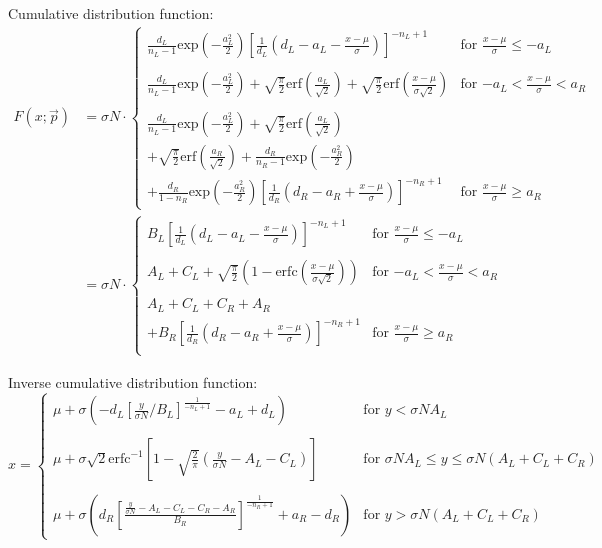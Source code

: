 Cumulative distribution function:
\begin{align}
F(x;\vec{p}) &= \sigma N \cdot \begin{cases}
\frac{d_{L}}{n_{L}-1}\text{exp}\left(-\frac{a_{L}^2}{2}\right) \left[\frac{1}{d_{L}}\left(d_{L}-a_{L}-\frac{x-\mu}{\sigma}\right)\right]^{-n_{L}+1} & \text{for $\frac{x-\mu}{\sigma} \leq -a_{L}$} \\
\\
\frac{d_{L}}{n_{L}-1}\text{exp}\left(-\frac{a_{L}^2}{2}\right) + \sqrt{\frac{\pi}{2}}\text{erf}\left(\frac{a_{L}}{\sqrt{2}}\right) + \sqrt{\frac{\pi}{2}}\text{erf}\left(\frac{x-\mu}{\sigma \sqrt{2}}\right) & \text{for $-a_{L} < \frac{x-\mu}{\sigma} < a_{R}$} \\
\\
\frac{d_{L}}{n_{L}-1}\text{exp}\left(-\frac{a_{L}^2}{2}\right) + \sqrt{\frac{\pi}{2}}\text{erf}\left(\frac{a_{L}}{\sqrt{2}}\right)\\
 + \sqrt{\frac{\pi}{2}}\text{erf}\left(\frac{a_{R}}{\sqrt{2}}\right) + \frac{d_{R}}{n_{R}-1}\text{exp}\left(-\frac{a_{R}^2}{2}\right) \\
 + \frac{d_{R}}{1-n_{R}}\text{exp}\left(-\frac{a_{R}^2}{2}\right) \left[\frac{1}{d_{R}}\left(d_{R}-a_{R}+\frac{x-\mu}{\sigma}\right)\right]^{-n_{R}+1} & \text{for $\frac{x-\mu}{\sigma} \geq a_{R}$}
\end{cases}\\
 &= \sigma N \cdot \begin{cases}
B_{L} \left[\frac{1}{d_{L}}\left(d_{L}-a_{L}-\frac{x-\mu}{\sigma}\right)\right]^{-n_{L}+1} & \text{for $\frac{x-\mu}{\sigma} \leq -a_{L}$} \\
\\
A_{L} + C_{L} + \sqrt{\frac{\pi}{2}}\left(1-\text{erfc}\left(\frac{x-\mu}{\sigma \sqrt{2}}\right)\right) & \text{for $-a_{L} < \frac{x-\mu}{\sigma} < a_{R}$} \\
\\
A_{L} + C_{L} + C_{R} + A_{R} \\
 + B_{R} \left[\frac{1}{d_{R}}\left(d_{R}-a_{R}+\frac{x-\mu}{\sigma}\right)\right]^{-n_{R}+1} & \text{for $\frac{x-\mu}{\sigma} \geq a_{R}$} \\
\end{cases}
\end{align}

Inverse cumulative distribution function:
\begin{equation}
x = \begin{cases}
\mu + \sigma \left(-d_{L}\left[\frac{y}{\sigma N}/B_{L}\right]^{\frac{1}{-n_{L}+1}}-a_{L}+d_{L} \right) & \text{for $y < \sigma N A_{L}$} \\
\\
\mu + \sigma \sqrt{2} \text{erfc}^{-1}\left[1-\sqrt{\frac{2}{\pi}}\left(\frac{y}{\sigma N}-A_{L}-C_{L}\right)\right] & \text{for $\sigma N A_{L} \leq y \leq \sigma N (A_{L} + C_{L} + C_{R})$} \\
\\
\mu + \sigma \left(d_{R}\left[\frac{\frac{y}{\sigma N} - A_{L} - C_{L} - C_{R} - A_{R}}{B_{R}}\right]^{\frac{1}{-n_{R}+1}}+a_{R}-d_{R}\right) & \text{for $y > \sigma N (A_{L} + C_{L} + C_{R})$}
\end{cases}
\end{equation}

